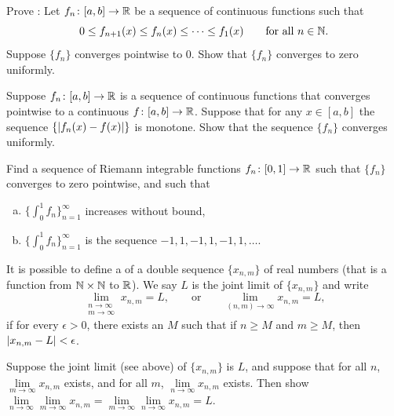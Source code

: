 \begin{exercise}[Hard] \label{exercise:dinisthm}
Prove \emph{}:
Let $f_n \colon [a,b] \to {\mathbb{R}}$ be a sequence of continuous functions such that
\begin{equation*}
0 \leq f_{n+1}(x) \leq f_n(x) \leq \cdots \leq f_1(x) 
\qquad \text{for all } n \in {\mathbb{N}}.
\end{equation*}
Suppose $\{ f_n \}$ converges pointwise to $0$.
Show that $\{ f_n \}$ converges to zero uniformly.
\end{exercise}

\begin{exercise}
Suppose $f_n \colon [a,b] \to {\mathbb{R}}$ is a sequence of continuous
functions that
converges pointwise
to a continuous $f \colon [a,b] \to {\mathbb{R}}$.  Suppose that
for any $x \in [a,b]$ the sequence $\{ \left\lvert {f_n(x)-f(x)} \right\rvert \}$ is monotone.
Show that the sequence $\{f_n\}$ converges uniformly.
\end{exercise}

\begin{exercise}
Find a sequence of Riemann integrable functions $f_n \colon [0,1] \to {\mathbb{R}}$ such
that $\{ f_n \}$ converges to zero pointwise, and such that
\begin{enumerate}[a)]
\item
$\bigl\{ \int_0^1 f_n \bigr\}_{n=1}^\infty$ increases without bound,
\item
$\bigl\{ \int_0^1 f_n \bigr\}_{n=1}^\infty$ is the sequence $-1,1,-1,1,-1,1, \ldots$.
\end{enumerate}
\end{exercise}

\begin{exnote}
It is possible to define a 
\emph{} of a double sequence $\{ x_{n,m} \}$ of real
numbers (that is a function from ${\mathbb{N}} \times {\mathbb{N}}$ to ${\mathbb{R}}$).
We say $L$ is the joint limit of $\{ x_{n,m} \}$ and write
\begin{equation*}
\lim_{\substack{n\to\infty\\m\to\infty}}
x_{n,m} = L ,
\qquad
\text{or}
\qquad
\lim_{(n,m) \to \infty}
x_{n,m} = L ,
\end{equation*}
if for every $\epsilon > 0$, there
exists an $M$ such that if $n \geq M$ and $m \geq M$, then
$\left\lvert {x_{n,m} - L} \right\rvert < \epsilon$.
\end{exnote}

\begin{exercise}
Suppose the joint limit (see above) of $\{ x_{n,m} \}$ is $L$, and suppose
that for all $n$, $\lim\limits_{m \to \infty} x_{n,m}$ exists,
and for all $m$, $\lim\limits_{n \to \infty} x_{n,m}$ exists.  Then show
$\lim\limits_{n\to\infty}\lim\limits_{m \to \infty} x_{n,m}
=
\lim\limits_{m\to\infty}\lim\limits_{n \to \infty} x_{n,m} = L$.
\end{exercise}

